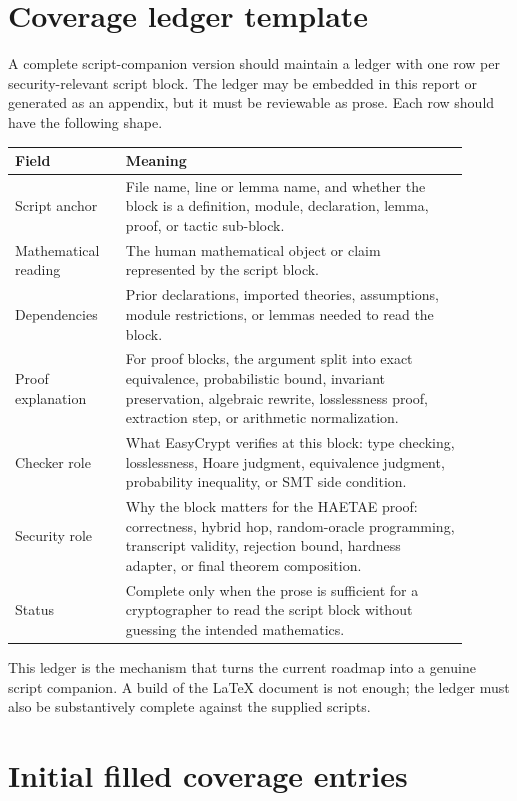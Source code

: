 \documentclass[11pt]{report}
\theoremstyle{definition}
\theoremstyle{plain}
\begin{document}
\section{Coverage ledger template}

A complete script-companion version should maintain a ledger with one row per
security-relevant script block.  The ledger may be embedded in this report or
generated as an appendix, but it must be reviewable as prose.  Each row should
have the following shape.

\begin{longtable}{p{0.22\linewidth}p{0.68\linewidth}}
\toprule
\textbf{Field} & \textbf{Meaning} \\
\midrule
Script anchor & File name, line or lemma name, and whether the block is a
definition, module, declaration, lemma, proof, or tactic sub-block. \\
Mathematical reading & The human mathematical object or claim represented by
the script block. \\
Dependencies & Prior declarations, imported theories, assumptions, module
restrictions, or lemmas needed to read the block. \\
Proof explanation & For proof blocks, the argument split into exact
equivalence, probabilistic bound, invariant preservation, algebraic rewrite,
losslessness proof, extraction step, or arithmetic normalization. \\
Checker role & What EasyCrypt verifies at this block: type checking,
losslessness, Hoare judgment, equivalence judgment, probability inequality, or
SMT side condition. \\
Security role & Why the block matters for the HAETAE proof: correctness,
hybrid hop, random-oracle programming, transcript validity, rejection bound,
hardness adapter, or final theorem composition. \\
Status & Complete only when the prose is sufficient for a cryptographer to read
the script block without guessing the intended mathematics. \\
\bottomrule
\end{longtable}

This ledger is the mechanism that turns the current roadmap into a genuine
script companion.  A build of the \LaTeX{} document is not enough; the ledger
must also be substantively complete against the supplied scripts.

\section{Initial filled coverage entries}
\end{document}
